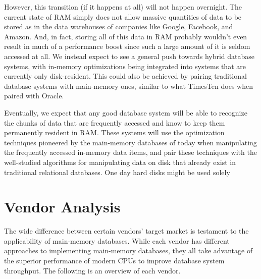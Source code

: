 \documentclass[11pt,a4paper]{report}
\begin{document}
However, this transition (if it happens at all) will not happen overnight. The current state of RAM simply does not allow massive quantities of data to be stored as in the data warehouses of companies like Google, Facebook, and Amazon. And, in fact, storing all of this data in RAM probably wouldn't even result in much of a performance boost since such a large amount of it is seldom accessed at all. We instead expect to see a general push towards hybrid database systems, with in-memory optimizations being integrated into systems that are currently only disk-resident. This could also be achieved by pairing traditional database systems with main-memory ones, similar to what TimesTen does when paired with Oracle. 

Eventually, we expect that any good database system will be able to recognize the chunks of data that are frequently accessed and know to keep them permanently resident in RAM. These systems will use the optimization techniques pioneered by the main-memory databases of today when manipulating the frequently accessed in-memory data items, and pair these techniques with the well-studied algorithms for manipulating data on disk that already exist in traditional relational databases. One day hard disks might be used solely 

\section{Vendor Analysis}
The wide difference between certain vendors' target market is testament to the applicability of main-memory databases. While each vendor has different approaches to implementing main-memory databases, they all take advantage of the superior performance of modern CPUs to improve database system throughput. The following is an overview of each vendor.
\end{document}
